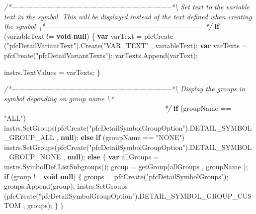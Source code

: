\documentclass[]{article}
\newenvironment{Shaded}{}{}
\newcommand{\KeywordTok}[1]{\textcolor[rgb]{0.00,0.44,0.13}{\textbf{{#1}}}}
\newcommand{\StringTok}[1]{\textcolor[rgb]{0.25,0.44,0.63}{{#1}}}
\newcommand{\CommentTok}[1]{\textcolor[rgb]{0.38,0.63,0.69}{\textit{{#1}}}}
\newcommand{\OtherTok}[1]{\textcolor[rgb]{0.00,0.44,0.13}{{#1}}}
\newcommand{\FunctionTok}[1]{\textcolor[rgb]{0.02,0.16,0.49}{{#1}}}
\newcommand{\NormalTok}[1]{{#1}}
\begin{document}
\begin{Shaded}
\begin{Highlighting}[]
\CommentTok{/*--------------------------------------------------------------------*\textbackslash{}    }
\CommentTok{ Set text to the variable text in the symbol. This will be displayed }
\CommentTok{ instead of the text defined when creating the symbol}
\CommentTok{\textbackslash{}*--------------------------------------------------------------------*/}        
  \KeywordTok{if} \NormalTok{(variableText != }\KeywordTok{void} \KeywordTok{null}\NormalTok{)}
  \NormalTok{\{}
      \KeywordTok{var} \NormalTok{varText = }\FunctionTok{pfcCreate} \NormalTok{(}\StringTok{"pfcDetailVariantText"}\NormalTok{).}\FunctionTok{Create}\NormalTok{(}\StringTok{"VAR_TEXT"} \NormalTok{, variableText);}
      \KeywordTok{var} \NormalTok{varTexts = }\FunctionTok{pfcCreate}\NormalTok{(}\StringTok{"pfcDetailVariantTexts"}\NormalTok{);}
      \OtherTok{varTexts}\NormalTok{.}\FunctionTok{Append}\NormalTok{(varText);}
      
      \OtherTok{instrs}\NormalTok{.}\FunctionTok{TextValues} \NormalTok{= varTexts;}
  \NormalTok{\}}

\CommentTok{/*--------------------------------------------------------------------*\textbackslash{}    }
\CommentTok{ Display the groups in symbol depending on group name}
\CommentTok{\textbackslash{}*--------------------------------------------------------------------*/}        
  \KeywordTok{if} \NormalTok{(groupName == }\StringTok{"ALL"}\NormalTok{)}
    \OtherTok{instrs}\NormalTok{.}\FunctionTok{SetGroups}\NormalTok{(}\FunctionTok{pfcCreate}\NormalTok{(}\StringTok{"pfcDetailSymbolGroupOption"}\NormalTok{).}\FunctionTok{DETAIL_SYMBOL_GROUP_ALL} \NormalTok{, }\KeywordTok{null}\NormalTok{);}
  \KeywordTok{else} \KeywordTok{if} \NormalTok{(groupName == }\StringTok{"NONE"}\NormalTok{)}
    \OtherTok{instrs}\NormalTok{.}\FunctionTok{SetGroups}\NormalTok{(}\FunctionTok{pfcCreate}\NormalTok{(}\StringTok{"pfcDetailSymbolGroupOption"}\NormalTok{).}\FunctionTok{DETAIL_SYMBOL_GROUP_NONE} \NormalTok{, }\KeywordTok{null}\NormalTok{);}
  \KeywordTok{else}
  \NormalTok{\{}
    \KeywordTok{var} \NormalTok{allGroups = }\OtherTok{instrs}\NormalTok{.}\OtherTok{SymbolDef}\NormalTok{.}\FunctionTok{ListSubgroups}\NormalTok{();}
    \NormalTok{group = }\FunctionTok{getGroup}\NormalTok{(allGroups , groupName );}
    \KeywordTok{if} \NormalTok{(group != }\KeywordTok{void} \KeywordTok{null}\NormalTok{)}
    \NormalTok{\{}
        \NormalTok{groups = }\FunctionTok{pfcCreate}\NormalTok{(}\StringTok{"pfcDetailSymbolGroups"}\NormalTok{);}
        \OtherTok{groups}\NormalTok{.}\FunctionTok{Append}\NormalTok{(group);}
        \OtherTok{instrs}\NormalTok{.}\FunctionTok{SetGroups} \NormalTok{(}\FunctionTok{pfcCreate}\NormalTok{(}\StringTok{"pfcDetailSymbolGroupOption"}\NormalTok{).}\FunctionTok{DETAIL_SYMBOL_GROUP_CUSTOM} \NormalTok{, groups);}
    \NormalTok{\}           }
  \NormalTok{\}}
                

\end{Highlighting}
\end{Shaded}
\end{document}
